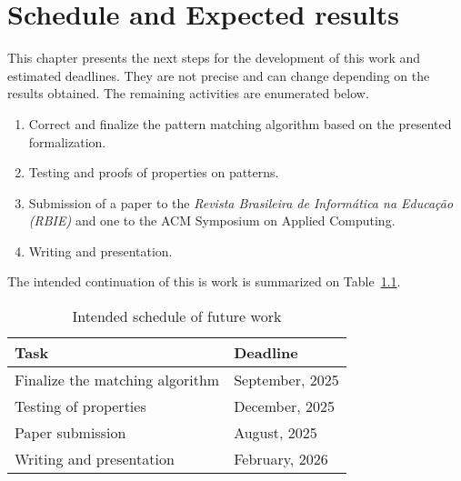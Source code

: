 \chapter{Schedule and Expected results}\label{chap:future-work}

This chapter presents the next steps for the development of this work and 
estimated deadlines. They are not precise and can change depending on the results
obtained. The remaining activities are enumerated below.

\begin{enumerate}
    \item Correct and finalize the pattern matching algorithm based on the 
        presented formalization.
    \item Testing and proofs of properties on patterns.
    \item Submission of a paper to the \textit{Revista Brasileira de Informática na Educação (RBIE)} 
        and one to the ACM Symposium on Applied Computing.
    \item Writing and presentation.
\end{enumerate}

The intended continuation of this is work is summarized on Table~\ref{table:schedule}.

\begin{table}[ht]
    \centering
    \caption{Intended schedule of future work}
    \label{table:schedule}
    \begin{tabular}{ll}
        \hline
        \textbf{Task} & \textbf{Deadline} \\
        \hline
        Finalize the matching algorithm & September, 2025 \\
        Testing of properties & December, 2025 \\
        Paper submission & August, 2025 \\
        Writing and presentation & February, 2026 \\
        \hline
    \end{tabular}
\end{table}